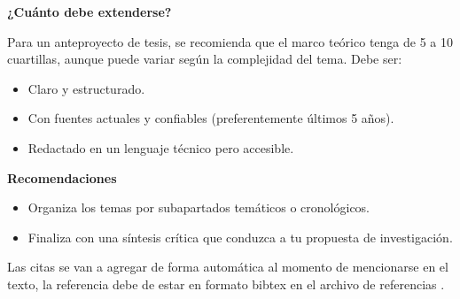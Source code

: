 \textbf{¿Cuánto debe extenderse?}

Para un anteproyecto de tesis, se recomienda que el marco teórico tenga de 5 a 10 cuartillas, aunque puede variar según la complejidad del tema. Debe ser:

\begin{itemize}
    \item Claro y estructurado.
    \item Con fuentes actuales y confiables (preferentemente últimos 5 años).
    \item Redactado en un lenguaje técnico pero accesible.
\end{itemize}

\textbf{Recomendaciones}

\begin{itemize}
    \item Organiza los temas por subapartados temáticos o cronológicos.
    \item Finaliza con una síntesis crítica que conduzca a tu propuesta de investigación.
\end{itemize}

Las citas se van a agregar de forma automática al momento de mencionarse en el texto, la referencia debe de estar en formato bibtex en el archivo de referencias \cite{Ellinidou2019} \cite{Benini2002,Ellinidou2019} \cite{Benini2002,dally2004principles,Ellinidou2019}.